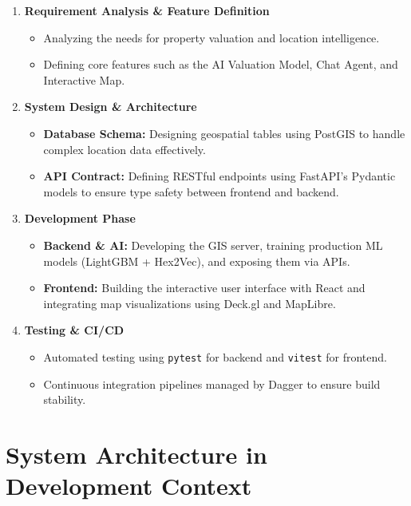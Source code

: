 \begin{enumerate}
    \item \textbf{Requirement Analysis \& Feature Definition}
    \begin{itemize}
        \item Analyzing the needs for property valuation and location intelligence.
        \item Defining core features such as the AI Valuation Model, Chat Agent, and Interactive Map.
    \end{itemize}

    \item \textbf{System Design \& Architecture}
    \begin{itemize}
        \item \textbf{Database Schema:} Designing geospatial tables using PostGIS to handle complex location data effectively.
        \item \textbf{API Contract:} Defining RESTful endpoints using FastAPI's Pydantic models to ensure type safety between frontend and backend.
    \end{itemize}

    \item \textbf{Development Phase}
    \begin{itemize}
        \item \textbf{Backend \& AI:} Developing the GIS server, training production ML models (LightGBM + Hex2Vec), and exposing them via APIs.
        \item \textbf{Frontend:} Building the interactive user interface with React and integrating map visualizations using Deck.gl and MapLibre.
    \end{itemize}

    \item \textbf{Testing \& CI/CD}
    \begin{itemize}
        \item Automated testing using \texttt{pytest} for backend and \texttt{vitest} for frontend.
        \item Continuous integration pipelines managed by Dagger to ensure build stability.
    \end{itemize}
\end{enumerate}

\section{System Architecture in Development Context}

